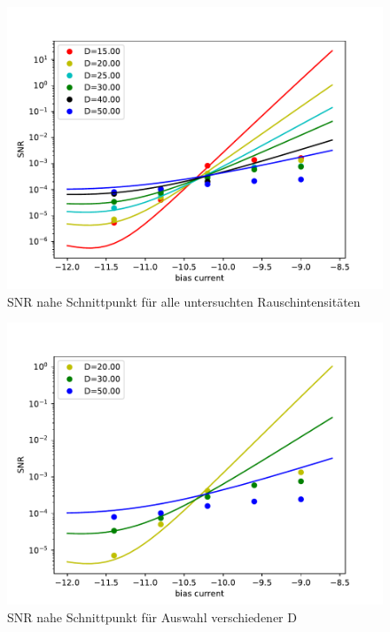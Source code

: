 \documentclass[12pt,a4paper]{article}
\begin{document}
\begin{figure}[H]
	\centering
	\includegraphics[scale=1]{snrinzelpoi6j17d.pdf}\caption{SNR nahe Schnittpunkt für alle untersuchten Rauschintensitäten}
	\label{rinzelsnrpoitot}
\end{figure}
\begin{figure}[H]
	\centering
	\includegraphics[scale=1]{snrinzelpoi6j17dshort.pdf}\caption{SNR nahe Schnittpunkt für Auswahl verschiedener D}
	\label{rinzelsnrpoisel}
\end{figure}
\end{document}
